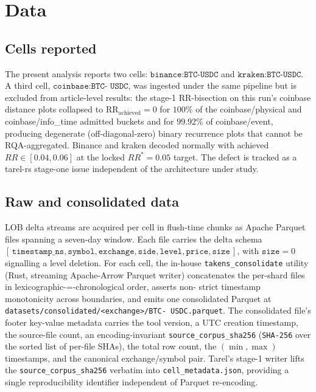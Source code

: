 \section{Data}
\label{sec:data}

\subsection*{Cells reported}
The present analysis reports two cells: $\texttt{binance:BTC-USDC}$
and $\texttt{kraken:BTC-USDC}$. A third cell, $\texttt{coinbase:BTC-
USDC}$, was ingested under the same pipeline but is excluded from
article-level results: the stage-1 RR-bisection on this run's
coinbase distance plots collapsed to $\mathrm{RR}_{\text{achieved}} =
0$ for $100\%$ of the coinbase/physical and coinbase/info\_time
admitted buckets and for $99.92\%$ of coinbase/event, producing
degenerate (off-diagonal-zero) binary recurrence plots that cannot
be RQA-aggregated. Binance and kraken decoded normally with achieved
$RR \in [0.04, 0.06]$ at the locked $RR^{*} = 0.05$ target. The
defect is tracked as a tarel-rs stage-one issue independent of the
architecture under study.

\subsection*{Raw and consolidated data}
LOB delta streams are acquired per cell in flush-time chunks as
Apache Parquet files spanning a seven-day window. Each file carries
the delta schema $[\,\texttt{timestamp\_ns}, \texttt{symbol},
\texttt{exchange}, \texttt{side}, \texttt{level}, \texttt{price},
\texttt{size}\,]$, with $\texttt{size}=0$ signalling a level
deletion. For each cell, the in-house \texttt{takens\_consolidate}
utility (Rust, streaming Apache-Arrow Parquet writer) concatenates the
per-shard files in lexicographic-=-chronological order, asserts non-
strict timestamp monotonicity across boundaries, and emits one
consolidated Parquet at \texttt{datasets/consolidated/<exchange>/BTC-
USDC.parquet}. The consolidated file's footer key-value metadata
carries the tool version, a UTC creation timestamp, the source-file
count, an encoding-invariant \texttt{source\_corpus\_sha256}
(\texttt{SHA-256} over the sorted list of per-file SHAs), the total
row count, the $(\min, \max)$ timestamps, and the canonical
exchange/symbol pair. Tarel's stage-1 writer lifts the
\texttt{source\_corpus\_sha256} verbatim into
\texttt{cell\_metadata.json}, providing a single reproducibility
identifier independent of Parquet re-encoding.

